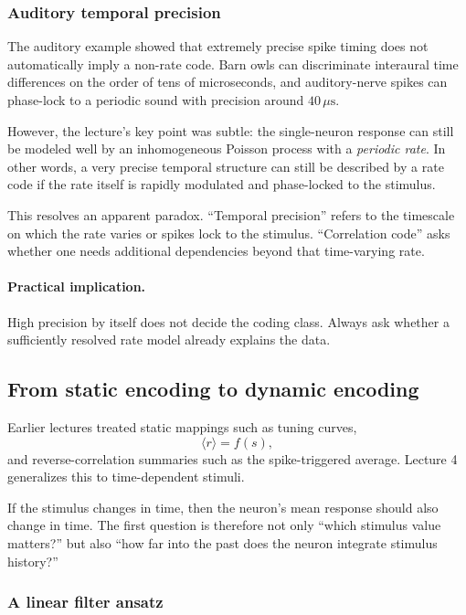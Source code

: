 \subsubsection{Auditory temporal precision}

The auditory example showed that extremely precise spike timing does not automatically imply a non-rate code. Barn owls can discriminate interaural time differences on the order of tens of microseconds, and auditory-nerve spikes can phase-lock to a periodic sound with precision around $40\,\mu\mathrm{s}$.

However, the lecture's key point was subtle: the single-neuron response can still be modeled well by an inhomogeneous Poisson process with a \emph{periodic rate}. In other words, a very precise temporal structure can still be described by a rate code if the rate itself is rapidly modulated and phase-locked to the stimulus.

This resolves an apparent paradox. ``Temporal precision'' refers to the timescale on which the rate varies or spikes lock to the stimulus. ``Correlation code'' asks whether one needs additional dependencies beyond that time-varying rate.

\paragraph{Practical implication.}
High precision by itself does not decide the coding class. Always ask whether a sufficiently resolved rate model already explains the data.

\subsection{From static encoding to dynamic encoding}

Earlier lectures treated static mappings such as tuning curves,
\[
\langle r \rangle = f(s),
\]
and reverse-correlation summaries such as the spike-triggered average. Lecture 4 generalizes this to time-dependent stimuli.

If the stimulus changes in time, then the neuron's mean response should also change in time. The first question is therefore not only ``which stimulus value matters?'' but also ``how far into the past does the neuron integrate stimulus history?''

\subsubsection{A linear filter ansatz}

